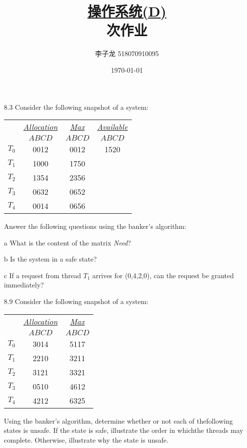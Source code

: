 \documentclass[12pt,a4paper]{article}
\newenvironment{problems}{\begin{list}{}{\renewcommand{\makelabel}[1]{\textbf{##1}\hfil}}}{\end{list}}
\newenvironment{steps}{\begin{list}{}{\renewcommand{\makelabel}[1]{##1.\hfil}}}{\end{list}}
\begin{document}
\title{\normalsize \underline{操作系统(D)}\\ 次作业}
\author{李子龙 518070910095}
\date{\today}
\maketitle

\begin{problems}
    \item[8.3] Consider the following snapshot of a system:
     
    \begin{tabular}{cccc}
         & \underline{\emph{Allocation}} & \underline{\emph{Max}} &  \underline{\emph{Available}}\\
         & $ABCD$ & $ABCD$ & $ABCD$\\
    $T_0$ & 0012 & 0012& 1520\\
    $T_1$ & 1000 & 1750& \\
    $T_2$ & 1354 & 2356& \\
    $T_3$ & 0632 & 0652& \\
    $T_4$ & 0014 & 0656&
    \end{tabular} 

    Answer the following questions using the banker's algorithm:
    \begin{steps}
        \item[a] What is the content of the matrix \emph{Need}?
        \item[b] Is the system in a safe state?
        \item[c] If a request from thread $T_1$ arrives for (0,4,2,0), can the request be granted immediately?
    \end{steps}

    \item[8.9] Consider the following snapshot of a system:
    
    \begin{tabular}{ccc}
        & \underline{\emph{Allocation}} & \underline{\emph{Max}} \\
        & $ABCD$ & $ABCD$ \\
   $T_0$ & 3014 & 5117\\
   $T_1$ & 2210 & 3211\\
   $T_2$ & 3121 & 3321\\
   $T_3$ & 0510 & 4612\\
   $T_4$ & 4212 & 6325
   \end{tabular} 
    
   Using the banker’s algorithm, determine whether or not each of thefollowing states is unsafe. If the state is safe, illustrate the order in whichthe threads may complete. Otherwise, illustrate why the state is unsafe.


\end{problems}
\end{document}
